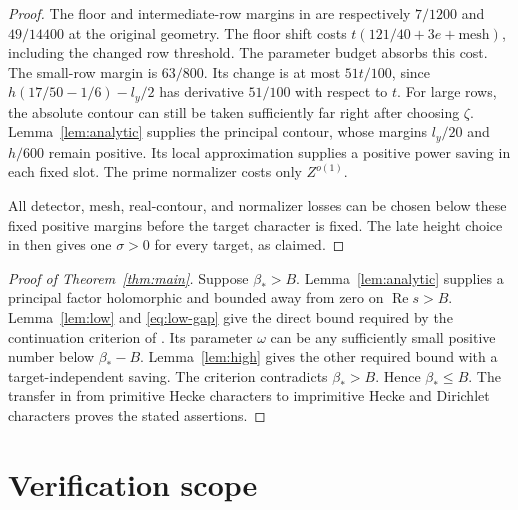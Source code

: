 \documentclass[11pt]{article}
\newcommand{\Ree}{\operatorname{Re}}
\begin{document}
\begin{proof}
The floor and intermediate-row margins in \cite{OAI} are respectively
$7/1200$ and $49/14400$ at the original geometry. The floor shift costs
$t(121/40+3e+\mathrm{mesh})$, including the changed row threshold. The
parameter budget absorbs this cost. The small-row
margin is $63/800$. Its change is at most $51t/100$, since
$h(17/50-1/6)-l_y/2$ has derivative $51/100$ with respect to $t$.
For large rows, the absolute contour can still be taken sufficiently far
right after choosing $\zeta$. Lemma~\ref{lem:analytic} supplies the
principal contour, whose margins $l_y/20$ and $h/600$ remain positive.
Its local approximation supplies a positive power saving in each fixed
slot. The prime normalizer costs only $Z^{o(1)}$.

All detector, mesh, real-contour, and normalizer losses can be chosen
below these fixed positive margins before the target character is fixed.
The late height choice in \cite{OAI} then gives one $\sigma>0$ for every
target, as claimed.
\end{proof}

\begin{proof}[Proof of Theorem~\ref{thm:main}]
Suppose $\beta_*>B$. Lemma~\ref{lem:analytic} supplies a principal
factor holomorphic and bounded away from zero on $\Ree s>B$.
Lemma~\ref{lem:low} and \eqref{eq:low-gap} give the direct bound required
by the continuation criterion of \cite[Section 2]{OAI}. Its parameter
$\omega$ can be any sufficiently small positive number below
$\beta_*-B$. Lemma~\ref{lem:high} gives the other required bound with a
target-independent saving. The criterion contradicts $\beta_*>B$.
Hence $\beta_*\le B$. The transfer in \cite{OAI} from primitive Hecke
characters to imprimitive Hecke and Dirichlet characters proves the
stated assertions.
\end{proof}

\section*{Verification scope}
\end{document}
